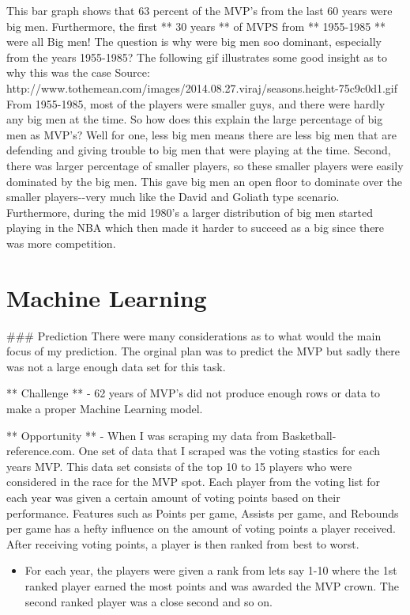 \documentclass[11pt]{article}
\providecommand{\tightlist}{%
      \setlength{\itemsep}{0pt}\setlength{\parskip}{0pt}}
\begin{document}
This bar graph shows that 63 percent of the MVP's from the last 60 years
were big men. Furthermore, the first ** 30 years ** of MVPS from **
1955-1985 ** were all Big men! The question is why were big men soo
dominant, especially from the years 1955-1985? The following gif
illustrates some good insight as to why this was the case Source:
http://www.tothemean.com/images/2014.08.27.viraj/seasons.height-75c9c0d1.gif
From 1955-1985, most of the players were smaller guys, and there were
hardly any big men at the time. So how does this explain the large
percentage of big men as MVP's? Well for one, less big men means there
are less big men that are defending and giving trouble to big men that
were playing at the time. Second, there was larger percentage of smaller
players, so these smaller players were easily dominated by the big men.
This gave big men an open floor to dominate over the smaller
players-\/-very much like the David and Goliath type scenario.
Furthermore, during the mid 1980's a larger distribution of big men
started playing in the NBA which then made it harder to succeed as a big
since there was more competition. 

    \section{Machine Learning}\label{machine-learning}

     \#\#\# Prediction There were many considerations as to what would the
main focus of my prediction. The orginal plan was to predict the MVP but
sadly there was not a large enough data set for this task.

** Challenge ** - 62 years of MVP's did not produce enough rows or data
to make a proper Machine Learning model.

** Opportunity ** - When I was scraping my data from
Basketball-reference.com. One set of data that I scraped was the voting
stastics for each years MVP. This data set consists of the top 10 to 15
players who were considered in the race for the MVP spot. Each player
from the voting list for each year was given a certain amount of voting
points based on their performance. Features such as Points per game,
Assists per game, and Rebounds per game has a hefty influence on the
amount of voting points a player received. After receiving voting
points, a player is then ranked from best to worst.

\begin{itemize}
\tightlist
\item
  For each year, the players were given a rank from lets say 1-10 where
  the 1st ranked player earned the most points and was awarded the MVP
  crown. The second ranked player was a close second and so on.
\end{itemize}
\end{document}
